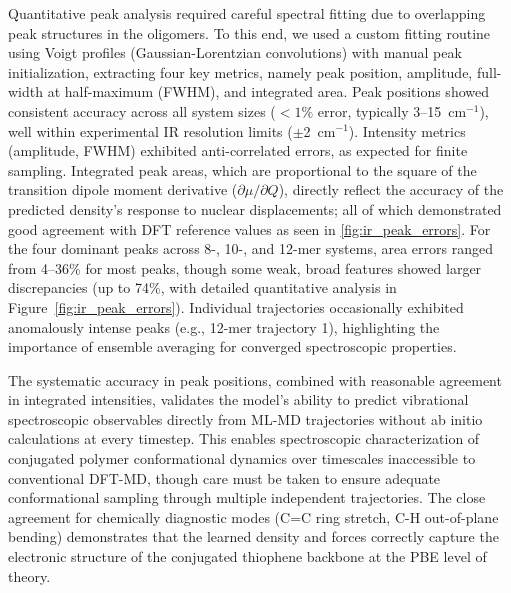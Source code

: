 \documentclass[12pt]{article}
\begin{document}
Quantitative peak analysis required careful spectral fitting due to overlapping peak structures in the oligomers.
To this end, we used a custom fitting routine using Voigt profiles (Gaussian-Lorentzian convolutions) with manual peak initialization, extracting four key metrics, namely peak position, amplitude, full-width at half-maximum (FWHM), and integrated area.
Peak positions showed consistent accuracy across all system sizes ($<1\%$ error, typically 3--15~cm$^\mathrm{-1}$), well within experimental IR resolution limits ($\pm$2~cm$^\mathrm{-1}$).
Intensity metrics (amplitude, FWHM) exhibited anti-correlated errors, as expected for finite sampling.
Integrated peak areas, which are proportional to the square of the transition dipole moment derivative ($\partial\mu/\partial Q$),  directly reflect the accuracy of the predicted density's response to nuclear displacements; all of which demonstrated good agreement with DFT reference values as seen in \cref{fig:ir_peak_errors}.
For the four dominant peaks across 8-, 10-, and 12-mer systems, area errors ranged from 4--36\% for most peaks, though some weak, broad features showed larger discrepancies (up to 74\%, with detailed quantitative analysis in Figure~\ref{fig:ir_peak_errors}).
Individual trajectories occasionally exhibited anomalously intense peaks (e.g., 12-mer trajectory 1), highlighting the importance of ensemble averaging for converged spectroscopic properties.

The systematic accuracy in peak positions, combined with reasonable agreement in integrated intensities, validates the model's ability to predict vibrational spectroscopic observables directly from ML-MD trajectories without ab initio calculations at every timestep.
This enables spectroscopic characterization of conjugated polymer conformational dynamics over timescales inaccessible to conventional DFT-MD, though care must be taken to ensure adequate conformational sampling through multiple independent trajectories.
The close agreement for chemically diagnostic modes (C=C ring stretch, C-H out-of-plane bending) demonstrates that the learned density and forces correctly capture the electronic structure of the conjugated thiophene backbone at the PBE level of theory.
\end{document}
